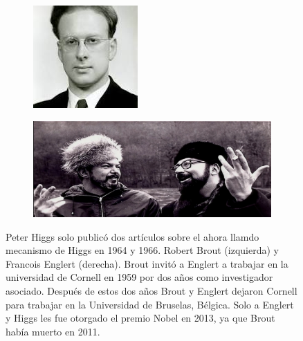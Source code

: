 	\begin{figure}
		\centering
		\begin{subfigure}{0.3\textwidth}
	\includegraphics[scale=0.8]{images/higgs_joven.jpeg}
	\caption{}
	\end{subfigure}
	\begin{subfigure}{0.6\textwidth}
		\centering
		\includegraphics[scale=0.25]{images/brout_englert.png}
		\caption{}
	\end{subfigure}
	\caption{Peter Higgs solo public\'o dos art\'iculos sobre el ahora llamdo mecanismo de Higgs en 1964 y 1966. Robert Brout (izquierda) y Francois Englert (derecha). Brout invit\'o a Englert a trabajar en la universidad de Cornell en 1959 por dos años como investigador asociado. Despu\'es de estos dos años Brout y Englert dejaron Cornell para trabajar en la Universidad de Bruselas, B\'elgica. Solo a Englert y Higgs les fue otorgado el premio Nobel en 2013, ya que Brout hab\'ia muerto en 2011.}
	\end{figure}
